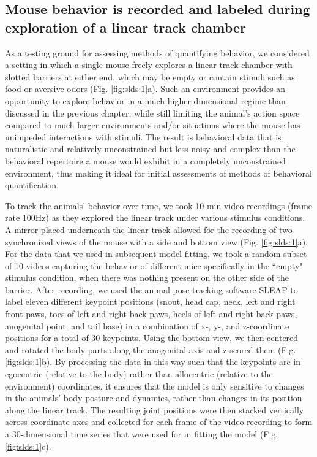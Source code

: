 \subsection{Mouse behavior is recorded and labeled during exploration of a linear track chamber}
\label{sec:slds:3.2.1}

As a testing ground for assessing methods of quantifying behavior, we considered a setting in which a single mouse freely explores a linear track chamber with slotted barriers at either end, which may be empty or contain stimuli such as food or aversive odors (Fig. \ref{fig:slds:1}a). Such an environment provides an opportunity to explore behavior in a much higher-dimensional regime than discussed in the previous chapter, while still limiting the animal's action space compared to much larger environments and/or situations where the mouse has unimpeded interactions with stimuli. The result is behavioral data that is naturalistic and relatively unconstrained but less noisy and complex than the behavioral repertoire a mouse would exhibit in a completely unconstrained environment, thus making it ideal for initial assessments of methods of behavioral quantification. 

To track the animals' behavior over time, we took 10-min video recordings (frame rate 100Hz) as they explored the linear track under various stimulus conditions. A mirror placed underneath the linear track allowed for the recording of two synchronized views of the mouse with a side and bottom view (Fig. \ref{fig:slds:1}a). For the data that we used in subsequent model fitting, we took a random subset of 10 videos capturing the behavior of different mice specifically in the ``empty" stimulus condition, when there was nothing present on the other side of the barrier. After recording, we used the animal pose-tracking software SLEAP \cite{pereira_sleap_2022} to label eleven different keypoint positions (snout, head cap, neck, left and right front paws, toes of left and right back paws, heels of left and right back paws, anogenital point, and tail base) in a combination of x-, y-, and z-coordinate positions for a total of 30 keypoints. Using the bottom view, we then centered and rotated the body parts along the anogenital axis and z-scored them (Fig. \ref{fig:slds:1}b). By processing the data in this way such that the keypoints are in egocentric (relative to the body) rather than allocentric (relative to the environment) coordinates, it ensures that the model is only sensitive to changes in the animals' body posture and dynamics, rather than changes in its position along the linear track. The resulting joint positions were then stacked vertically across coordinate axes and collected for each frame of the video recording to form a 30-dimensional time series that were used for in fitting the model (Fig. \ref{fig:slds:1}c).


